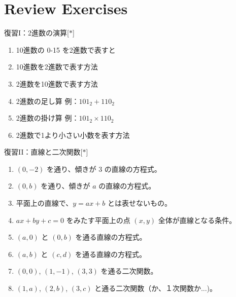 \documentclass[10pt, dvipdfmx]{beamer}
\begin{document}
\section{Review Exercises}
\begin{frame}{復習I：2進数の演算\hfill [$\ast$]}

\begin{enumerate}
\item   10進数の 0-15 を2進数で表すと

\bigskip
\item   10進数を2進数で表す方法

\bigskip
\item   2進数を10進数で表す方法

\bigskip
\item   2進数の足し算 例：$101_2 + 110_2$

\bigskip
\item   2進数の掛け算 例：$101_2 \times 110_2$

\bigskip
\item   2進数で1より小さい小数を表す方法

\end{enumerate}
\end{frame}
\begin{frame}{復習II：直線と二次関数\hfill [$\ast$]}

\begin{enumerate}
\item  $(0,-2)$ を通り、傾きが $3$ の直線の方程式。

\bigskip
\item   $(0,b)$ を通り、傾きが $a$ の直線の方程式。

\bigskip
\item  平面上の直線で、$y = ax+b$ とは表せないもの。

\bigskip
\item   $ax + by + c = 0$ をみたす平面上の点 $(x,y)$ 全体が直線となる条件。

\bigskip
\item   $(a,0)$ と $(0,b)$ を通る直線の方程式。

\bigskip
\item   $(a,b)$ と $(c,d)$ を通る直線の方程式。

\bigskip
\item  $(0,0)$, $(1,-1)$, $(3,3)$ を通る二次関数。

\bigskip
\item   $(1,a)$, $(2,b)$, $(3,c)$ と通る二次関数（か、１次関数か...)。
\end{enumerate}
\end{frame}
\end{document}
